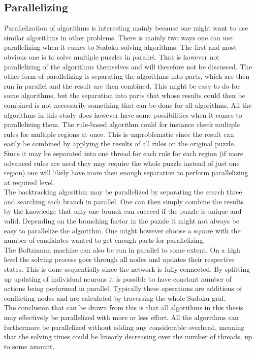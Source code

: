 \documentclass[a4paper,11pt]{kth-mag}
\begin{document}
\subsection{Parallelizing}
Parallelization of algorithms is interesting mainly because one might want to use similar algorithms in other problems.
There is mainly two ways one can use parallelizing when it comes to Sudoku solving algorithms.
The first and most obvious one is to solve multiple puzzles in parallel.
That is however not parallelizing of the algorithms themselves and will therefore not be discussed.
The other form of parallelizing is separating the algorithms into parts, which are then run in parallel and the result are then combined.
This might be easy to do for some algorithms, but the separation into parts that whose results could then be combined is not necessarily something that can be done for all algorithms.
All the algorithms in this study does however have some possibilities when it comes to parallelizing them.
The rule-based algorithm could for instance check multiple rules for multiple regions at once.
This is unproblematic since the result can easily be combined by applying the results of all rules on the original puzzle.
Since it may be separated into one thread for each rule for each region (if more advanced rules are used they may require the whole puzzle instead of just one region) one will likely have more then enough separation to perform parallelizing at required level.
\\
The backtracking algorithm may be parallelized by separating the search three and searching each branch in parallel.
One can then simply combine the results by the knowledge that only one branch can succeed if the puzzle is unique and valid.
Depending on the branching factor in the puzzle it might not always be easy to parallelize the algorithm.
One might however choose a square with the number of candidates wanted to get enough parts for parallelizing.
\\
The Boltzmann machine can also be run in parallel to some extent.
On a high level the solving process goes through all nodes and updates their respective states.
This is done sequentially since the network is fully connected.
By splitting up updating of individual neurons it is possible to have constant number of actions being performed in parallel.
Typically these operations are additions of conflicting nodes and are calculated by traversing the whole Sudoku grid.
\\
The conclusion that can be drawn from this is that all algorithms in this thesis may effectively be parallelized with more or less effort.
All the algorithms can furthermore be parallelized without adding any considerable overhead, meaning that the solving times could be linearly decreasing over the number of threads, up to some amount.
\end{document}
